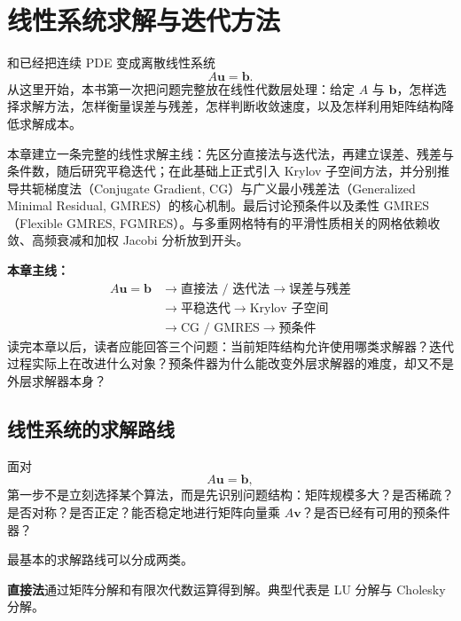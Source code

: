\chapter{线性系统求解与迭代方法}
\label{ch:linear-solvers}

和已经把连续 PDE 变成离散线性系统
\begin{equation}
A\bm u=\bm b.
\end{equation}
从这里开始，本书第一次把问题完整放在线性代数层处理：给定 $A$ 与 $\bm b$，怎样选择求解方法，怎样衡量误差与残差，怎样判断收敛速度，以及怎样利用矩阵结构降低求解成本。

本章建立一条完整的线性求解主线：先区分直接法与迭代法，再建立误差、残差与条件数，随后研究平稳迭代；在此基础上正式引入 Krylov 子空间方法，并分别推导共轭梯度法（Conjugate Gradient, CG）与广义最小残差法（Generalized Minimal Residual, GMRES）的核心机制。最后讨论预条件以及柔性 GMRES（Flexible GMRES, FGMRES）。与多重网格特有的平滑性质相关的网格依赖收敛、高频衰减和加权 Jacobi 分析放到开头。

\begin{keybox}
\textbf{本章主线：}
\[
\boxed{
\begin{aligned}
A\bm u=\bm b
&\rightarrow
\text{直接法 / 迭代法}
\rightarrow
\text{误差与残差}
\\
&\rightarrow
\text{平稳迭代}
\rightarrow
\text{Krylov 子空间}
\\
&\rightarrow
\text{CG / GMRES}
\rightarrow
\text{预条件}
\end{aligned}
}
\]
读完本章以后，读者应能回答三个问题：当前矩阵结构允许使用哪类求解器？迭代过程实际上在改进什么对象？预条件器为什么能改变外层求解器的难度，却又不是外层求解器本身？
\end{keybox}

\section{线性系统的求解路线}
\label{sec:linear-solver-map}

面对
\begin{equation}
A\bm u=\bm b,
\end{equation}
第一步不是立刻选择某个算法，而是先识别问题结构：矩阵规模多大？是否稀疏？是否对称？是否正定？能否稳定地进行矩阵向量乘 $A\bm v$？是否已经有可用的预条件器？

最基本的求解路线可以分成两类。

\textbf{直接法}通过矩阵分解和有限次代数运算得到解。典型代表是 LU 分解与 Cholesky 分解。

